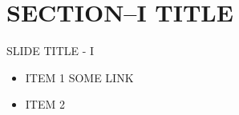 


\maketitle
\section{SECTION--I TITLE}
\begin{frame}[t]{SLIDE TITLE - I}
    \begin{itemize}
      \item ITEM 1
      SOME LINK
      \item ITEM 2
    \end{itemize}

\end{frame}


